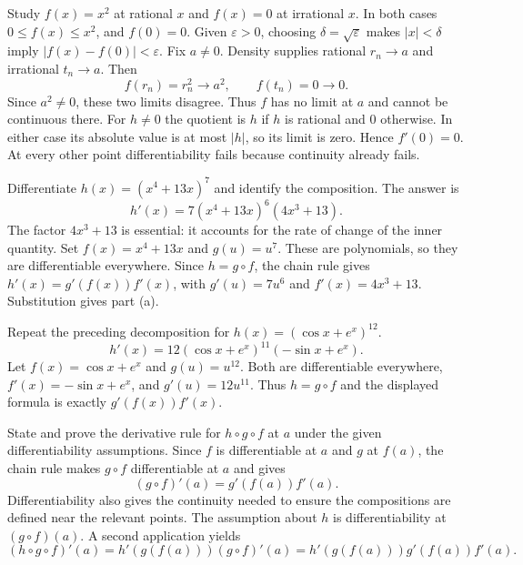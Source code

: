 \goal Study $f(x)=x^2$ at rational $x$ and $f(x)=0$ at irrational $x$.
In both cases $0\le f(x)\le x^2$, and $f(0)=0$. Given $\varepsilon>0$, choosing $\delta=\sqrt\varepsilon$ makes $|x|<\delta$ imply $|f(x)-f(0)|<\varepsilon$.
Fix $a\ne0$. Density supplies rational $r_n\to a$ and irrational $t_n\to a$. Then
\[
 f(r_n)=r_n^2\longrightarrow a^2,\qquad f(t_n)=0\longrightarrow0.
\]
Since $a^2\ne0$, these two limits disagree. Thus $f$ has no limit at $a$ and cannot be continuous there.
For $h\ne0$ the quotient is $h$ if $h$ is rational and $0$ otherwise. In either case its absolute value is at most $|h|$, so its limit is zero. Hence $f'(0)=0$. At every other point differentiability fails because continuity already fails.

\goal Differentiate $h(x)=(x^4+13x)^7$ and identify the composition.
The answer is
\[
 h'(x)=7(x^4+13x)^6(4x^3+13).
\]
The factor $4x^3+13$ is essential: it accounts for the rate of change of the inner quantity.
Set $f(x)=x^4+13x$ and $g(u)=u^7$. These are polynomials, so they are differentiable everywhere. Since $h=g\circ f$, the chain rule gives $h'(x)=g'(f(x))f'(x)$, with $g'(u)=7u^6$ and $f'(x)=4x^3+13$. Substitution gives part (a).

\goal Repeat the preceding decomposition for $h(x)=(\cos x+e^x)^{12}$.
\[
 h'(x)=12(\cos x+e^x)^{11}(-\sin x+e^x).
\]
Let $f(x)=\cos x+e^x$ and $g(u)=u^{12}$. Both are differentiable everywhere, $f'(x)=-\sin x+e^x$, and $g'(u)=12u^{11}$. Thus $h=g\circ f$ and the displayed formula is exactly $g'(f(x))f'(x)$.

\goal State and prove the derivative rule for $h\circ g\circ f$ at $a$ under the given differentiability assumptions.
Since $f$ is differentiable at $a$ and $g$ at $f(a)$, the chain rule makes $g\circ f$ differentiable at $a$ and gives
\[
 (g\circ f)'(a)=g'(f(a))f'(a).
\]
Differentiability also gives the continuity needed to ensure the compositions are defined near the relevant points.
The assumption about $h$ is differentiability at $(g\circ f)(a)$. A second application yields
\[
 (h\circ g\circ f)'(a)
 =h'(g(f(a)))(g\circ f)'(a)
 =h'(g(f(a)))g'(f(a))f'(a).
\]

